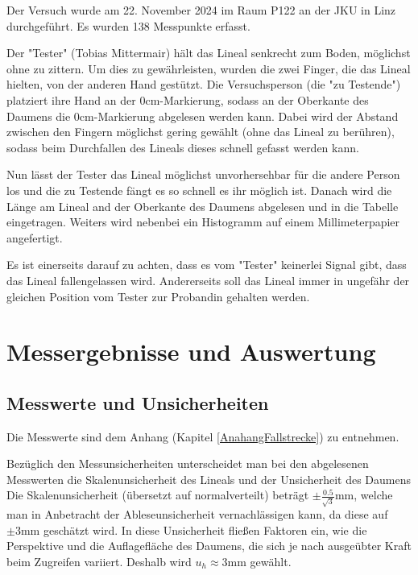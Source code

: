 \documentclass[a4paper,12pt]{article}
\begin{document}
Der Versuch wurde am 22. November 2024 im Raum P122 an der JKU in Linz durchgeführt. Es wurden 138 Messpunkte erfasst.

Der "Tester" (Tobias Mittermair) hält das Lineal senkrecht zum
Boden, möglichst ohne zu zittern. Um dies zu gewährleisten, wurden die zwei Finger, die das Lineal hielten, von 
der anderen Hand gestützt. Die Versuchsperson (die "zu
Testende") platziert ihre Hand an der 0cm-Markierung, sodass an der Oberkante des Daumens die 0cm-Markierung 
abgelesen werden kann. Dabei wird der Abstand zwischen den Fingern möglichst gering gewählt (ohne das Lineal zu 
berühren), sodass beim Durchfallen des Lineals dieses schnell gefasst werden kann.

Nun lässt der Tester das Lineal möglichst unvorhersehbar für die andere Person los und die zu Testende fängt es 
so schnell es ihr möglich ist.
Danach wird die Länge am Lineal and der Oberkante des Daumens abgelesen und in
die Tabelle eingetragen. Weiters wird nebenbei ein Histogramm auf einem Millimeterpapier
angefertigt.

Es ist einerseits darauf zu achten, dass es vom "Tester" keinerlei Signal gibt, dass das Lineal
fallengelassen wird. Andererseits soll das Lineal immer in ungefähr der gleichen Position vom Tester zur Probandin
gehalten werden.

\section{Messergebnisse und Auswertung}
\subsection{Messwerte und Unsicherheiten}

Die Messwerte sind dem Anhang (Kapitel \ref{AnahangFallstrecke}) zu entnehmen. 

Bezüglich den Messunsicherheiten unterscheidet man bei den abgelesenen Messwerten die 
Skalenunsicherheit des Lineals und der Unsicherheit des Daumens 
Die Skalenunsicherheit (übersetzt auf normalverteilt) beträgt $\pm \frac{0.5}{\sqrt{3}}\mathrm{mm}$,
welche man in Anbetracht der Ableseunsicherheit vernachlässigen kann, da diese auf $\pm 3\mathrm{mm}$
geschätzt wird. In diese Unsicherheit fließen Faktoren ein, wie die Perspektive
und die Auflagefläche des Daumens, die sich je nach ausgeübter Kraft beim Zugreifen variiert.
Deshalb wird $u_h \approx 3\mathrm{mm}$ gewählt.
\end{document}
